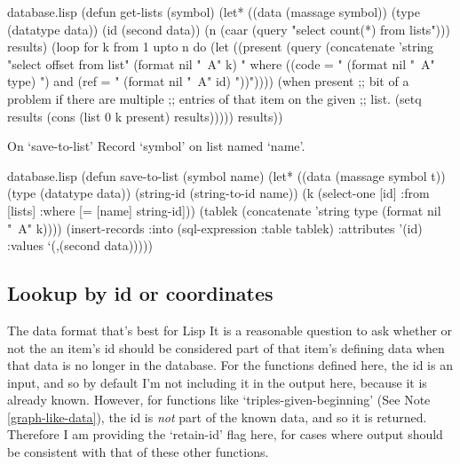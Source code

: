 \begin{common}{database.lisp}
(defun get-lists (symbol)
  (let* ((data (massage symbol))
         (type (datatype data))
         (id (second data))
         (n (caar
             (query "select count(*) from lists")))
         results)
    (loop for k from 1 upto n
          do (let ((present
                    (query (concatenate
                            'string
                            "select offset from list"
                            (format nil "~A" k)
                            " where ((code = "
                            (format nil "~A" type)
                            ") and (ref = "
                            (format nil "~A" id)
                            "))"))))
               (when present
                 ;; bit of a problem if there are multiple
                 ;; entries of that item on the given
                 ;; list.
                 (setq results (cons (list 0 k present)
                                     results)))))
    results))
\end{common}

\begin{notate}{On `save-to-list'}
Record `symbol' on list named `name'.
\end{notate}

\begin{common}{database.lisp}
(defun save-to-list (symbol name)
  (let* ((data (massage symbol t))
         (type (datatype data))
         (string-id (string-to-id name))
         (k (select-one [id]
                        :from [lists]
                        :where [= [name] string-id]))
         (tablek (concatenate 'string
                              type (format nil "~A" k))))
    (insert-records :into (sql-expression :table tablek)
                    :attributes '(id)
                    :values `(,(second data)))))
\end{common}

\subsection*{Lookup by id or coordinates}

\begin{notate}{The data format that's best for Lisp} \label{what-is-best-for-lisp}
It is a reasonable question to ask whether or not the an
item's id should be considered part of that item's
defining data when that data is no longer in the database.
For the functions defined here, the id is an input, and so
by default I'm not including it in the output here,
because it is already known.  However, for functions like
`triples-given-beginning' (See Note
\ref{graph-like-data}), the id is \emph{not} part of the
known data, and so it is returned.  Therefore I am
providing the `retain-id' flag here, for cases where
output should be consistent with that of these other
functions.
\end{notate}

